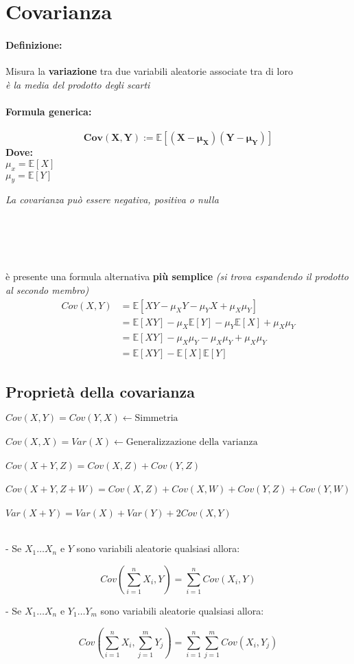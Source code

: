\documentclass[]{article}
\newcommand{\ev}{\mathbb{E}[X]}
\renewcommand{\ev}[1]{\mathbb{E}[#1]}
\newcommand{\definizione}{\paragraph{Definizione:}}
\newcommand{\formula}{\paragraph{Formula generica:}}
\begin{document}
    \section{Covarianza}
    \definizione Misura la \textbf{variazione} tra due variabili aleatorie associate tra di loro \\
    \textit{è la media del prodotto degli scarti}
    \formula \[ \boldsymbol{Cov(X,Y) := \ev{(X - \mu_X) (Y - \mu_Y)}} \]
    \textbf{Dove:} \\
    $ \mu_x = \ev{X} $ \\
    $ \mu_y = \ev{Y} $ \\
    \linebreak[4]
    \centerline{\textit{La covarianza può essere negativa, positiva o nulla } }
     \\
     \\
     \\ \\
    è presente una formula alternativa \textbf{più semplice} \textit{(si trova espandendo il prodotto al secondo membro)}
    \begin{equation*}
        \begin{split} 
            Cov(X, Y) &= \ev{XY - \mu_XY - \mu_YX + \mu_X \mu_Y} \\
            & = \ev{XY} - \mu_X \ev{Y} - \mu_Y \ev{X} + \mu_X \mu_Y \\ 
            & = \ev{XY} - \mu_X \mu_Y - \mu_X \mu_Y  + \mu_X \mu_Y  \\
            & = \ev{XY} - \ev{X} \ev{Y}
        \end{split}
    \end{equation*}


    \subsection{Proprietà della covarianza}
    $ Cov(X, Y) = Cov(Y, X) \longleftarrow \text{Simmetria} $ \\ \\
    $ Cov(X, X) = Var(X) \longleftarrow \text{Generalizzazione della varianza} $ \\ \\
    $ Cov(X+Y, Z) = Cov(X, Z) + Cov(Y, Z) $ \\ \\
    $ Cov(X+Y, Z+W) = Cov(X, Z) + Cov(X, W) + Cov(Y, Z) + Cov(Y, W) $ \\ \\
    $ Var(X + Y) = Var(X) + Var(Y) + 2 Cov(X, Y) $ \\ \\
    \centerline{- Se $X_1 \ldots X_n$ e $Y $ sono variabili aleatorie qualsiasi allora:}
    \[ Cov(\sum_{i = 1}^{n}X_i, Y) = \sum_{i = 1}^{n} Cov(X_i, Y) \]
    \centerline{- Se $X_1 \ldots X_n$ e $Y_1 \ldots Y_m$ sono variabili aleatorie qualsiasi allora:}
    \[ Cov(\sum_{i = 1}^{n}X_i, \sum_{j = 1}^{m} Y_j) = \sum_{i = 1}^{n} \sum_{j = 1}^{m} Cov(X_i, Y_j) \] \\
\end{document}
